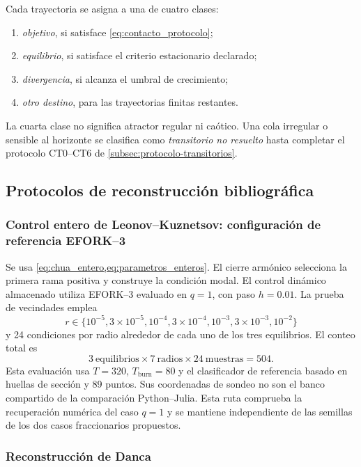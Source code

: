 Cada trayectoria se asigna a una de cuatro clases:

\begin{enumerate}
  \item \emph{objetivo}, si satisface \cref{eq:contacto_protocolo};
  \item \emph{equilibrio}, si satisface el criterio estacionario declarado;
  \item \emph{divergencia}, si alcanza el umbral de crecimiento;
  \item \emph{otro destino}, para las trayectorias finitas restantes.
\end{enumerate}

La cuarta clase no significa atractor regular ni caótico. Una cola irregular o
sensible al horizonte se clasifica como \emph{transitorio no resuelto} hasta
completar el protocolo CT0--CT6 de \cref{subsec:protocolo-transitorios}.

\subsection{Protocolos de reconstrucción bibliográfica}
\label{subsec:protocolos_bibliograficos}

\subsubsection{Control entero de Leonov--Kuznetsov: configuración de referencia EFORK--3}

Se usa \cref{eq:chua_entero,eq:parametros_enteros}. El cierre armónico
selecciona la primera rama positiva y construye la condición modal. El control
dinámico almacenado utiliza EFORK--3 evaluado en \(q=1\), con paso \(h=0.01\).
La prueba de vecindades emplea
\[
r\in\{10^{-5},3{\times}10^{-5},10^{-4},3{\times}10^{-4},
10^{-3},3{\times}10^{-3},10^{-2}\}
\]
y 24 condiciones por radio alrededor de cada uno de los tres equilibrios. El
conteo total es
\[
3\ \text{equilibrios}\times7\ \text{radios}\times24\ \text{muestras}
=504.
\]
Esta evaluación usa \(T=320\), \(T_{\mathrm{burn}}=80\) y el clasificador
de referencia basado en huellas de sección y 89 puntos. Sus
coordenadas de sondeo no son el banco compartido de la comparación
Python--Julia.
Esta ruta comprueba la recuperación numérica del caso \(q=1\) y se mantiene
independiente de las semillas de los dos casos fraccionarios propuestos.

\subsubsection{Reconstrucción de Danca}

